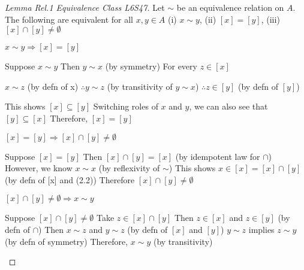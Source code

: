 \documentclass[a4paper]{article}
\theoremstyle{definition}
\begin{document}
\begin{proof}[Lemma Rel.1 Equivalence Class L6S47] Let $\sim$ be an equivalence relation on $A$. The following are equivalent for all $x, y \in A$ (i) $x\sim y$, (ii) $[x] = [y]$, (iii) $[x] \cap [y] \not = \emptyset$
  \begin{numpf*}
    \pfln $x \sim y \Rightarrow [x] = [y]$
    \begin{subpf*}
      \pfln Suppose $x \sim y$
      \pfln Then $y \sim x$ (by symmetry)
      \pfln For every $z \in [x]$
      \begin{subpf*}
        \pfln $x \sim z$ (by defn of x)
        \pfln $\therefore y \sim z$ (by transitivity of $y\sim x$)
        \pfln $\therefore z \in [y]$ (by defn of $[y]$)
      \end{subpf*}
      \pfln This shows $[x] \subseteq [y]$
      \pfln Switching roles of $x$ and $y$, we can also see that $[y] \subseteq [x]$
      \pfln Therefore, $[x] = [y]$
    \end{subpf*}
    \pfln $[x] = [y] \Rightarrow [x] \cap [y] \not = \emptyset$
    \begin{subpf*}
      \pfln Suppose $[x] = [y]$
      \pfln Then $[x] \cap [y] = [x]$ (by idempotent law for $\cap$)
      \pfln However, we know $x\sim x$ (by reflexivity of $\sim$)
      \pfln This shows $x \in [x] = [x] \cap [y]$ (by defn of [x] and (2.2))
      \pfln Therefore $[x] \cap [y] \not = \emptyset$
    \end{subpf*}
    \pfln $[x] \cap [y] \not = \emptyset \Rightarrow x \sim y$
    \begin{subpf*}
      \pfln Suppose $[x] \cap [y] \not = \emptyset$
      \pfln Take $z \in [x] \cap [y]$
      \pfln Then $z \in [x]$ and $z \in [y]$ (by defn of $\cap$)
      \pfln Then $x \sim z$ and $y \sim z$ (by defn of $[x]$ and $[y]$)
      \pfln $y \sim z$ implies $z \sim y$ (by defn of symmetry)
      \pfln Therefore, $x \sim y$ (by transitivity)
    \end{subpf*}
  \end{numpf*}
\end{proof}
\end{document}
